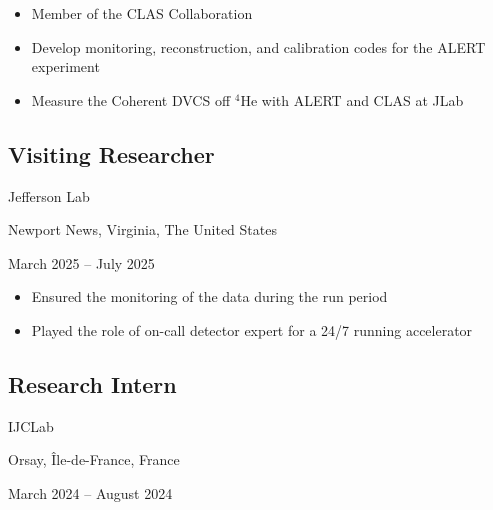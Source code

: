 \documentclass[10pt,a4paper]{article}
\begin{document}
\begin{itemize}[label=$\circ$, itemsep=1pt]
    \item Member of the CLAS Collaboration
    \item Develop monitoring, reconstruction, and calibration codes for the ALERT experiment
    \item Measure the Coherent DVCS off $^4\mbox{He}$ with ALERT and CLAS at JLab
\end{itemize}


\subsection*{Visiting Researcher}

\begin{minipage}{0.3\linewidth}
    Jefferson Lab
\end{minipage}
\begin{minipage}{0.4\linewidth}
    \raggedright
    Newport News, Virginia, The United States
\end{minipage}
\begin{minipage}{0.3\linewidth}
    \raggedleft
    March 2025 -- July 2025
\end{minipage}

\begin{itemize}[label=$\circ$, itemsep=1pt]
    \item Ensured the monitoring of the data during the run period
    \item Played the role of on-call detector expert for a 24/7 running accelerator
\end{itemize}



\subsection*{Research Intern}

\begin{minipage}{0.3\linewidth}
    IJCLab
\end{minipage}
\begin{minipage}{0.4\linewidth}
    \raggedright
    Orsay, Île-de-France, France
\end{minipage}
\begin{minipage}{0.3\linewidth}
    \raggedleft
    March 2024 -- August 2024
\end{minipage}
\end{document}
